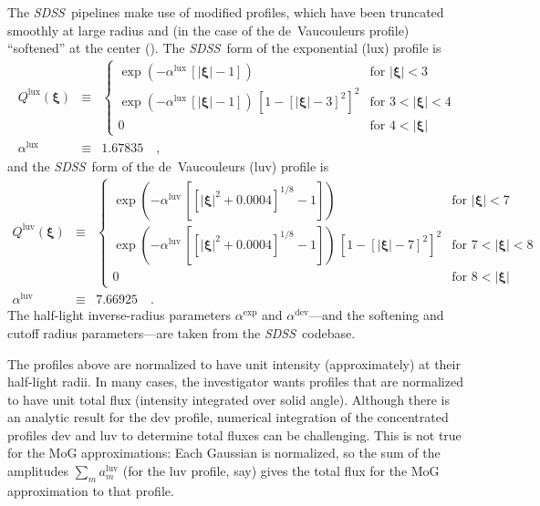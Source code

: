 \documentclass[12pt,pdftex,preprint]{aastex}
\newcommand{\project}[1]{\textsl{#1}}
\newcommand{\sdss}{\project{SDSS}}
\newcommand{\tvector}[1]{\boldsymbol{#1}}
\newcommand{\spos}{\tvector{\xi}}
\newcommand{\dev}{\mathrm{dev}}
\newcommand{\lux}{\mathrm{lux}}
\newcommand{\luv}{\mathrm{luv}}
\begin{document}
The \sdss\ pipelines make use of modified profiles, which have been
truncated smoothly at large radius and (in the case of the
de~Vaucouleurs profile) ``softened'' at the center (\citealt{lupton}).
The \sdss\ form of the exponential (lux) profile is
\begin{eqnarray}\displaystyle
Q^{\lux}(\spos) &\equiv& \left\{\begin{array}{ll}
  \exp(-\alpha^{\lux}\,[|\spos| - 1]) & \mbox{for~}|\spos| < 3 \\
  \exp(-\alpha^{\lux}\,[|\spos| - 1])
  \,\left[1 - [|\spos| - 3]^2\right]^2 & \mbox{for~}3 < |\spos| < 4 \\
  0                                   & \mbox{for~}4 < |\spos|
\end{array}\right.
\\
\alpha^{\lux} &\equiv& 1.67835
\quad ,
\end{eqnarray}
and the \sdss\ form of the de~Vaucouleurs (luv) profile is
\begin{eqnarray}\displaystyle
Q^{\luv}(\spos) &\equiv& \left\{\begin{array}{ll}
  \exp(-\alpha^{\luv}\,\left[[|\spos|^2 + 0.0004]^{1/8} - 1\right]) & \mbox{for~}|\spos| < 7 \\
  \exp(-\alpha^{\luv}\,\left[[|\spos|^2 + 0.0004]^{1/8} - 1\right])
  \,\left[1 - [|\spos| - 7]^2\right]^2 & \mbox{for~}7 < |\spos| < 8 \\
  0                                   & \mbox{for~}8 < |\spos|
\end{array}\right.
\\
\alpha^{\luv} &\equiv& 7.66925
\quad .
\end{eqnarray}
The half-light inverse-radius parameters $\alpha^{\exp}$ and
$\alpha^{\dev}$---and the softening and cutoff radius parameters---are
taken from the \sdss\ codebase.

The profiles above are normalized to have unit intensity
(approximately) at their half-light radii.  In many cases, the
investigator wants profiles that are normalized to have unit total
flux (intensity integrated over solid angle).  Although there is an
analytic result for the dev profile, numerical integration of the
concentrated profiles dev and luv to determine total fluxes can be
challenging.  This is not true for the MoG approximations: Each
Gaussian is normalized, so the sum of the amplitudes $\sum_m
a^{\luv}_m$ (for the luv profile, say) gives the total flux for the
MoG approximation to that profile.
\end{document}
